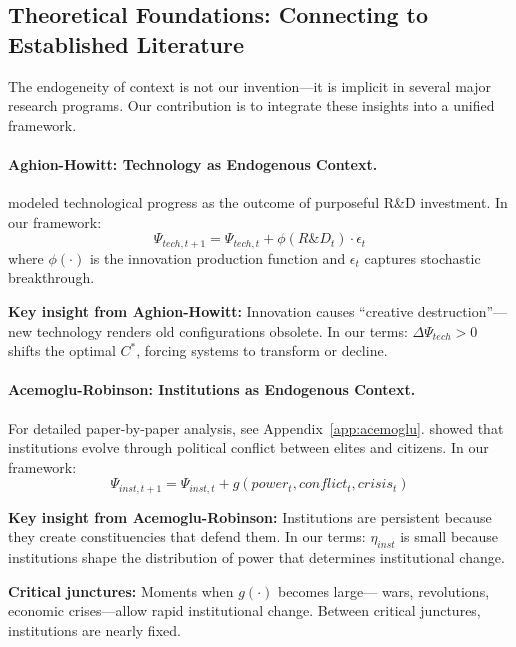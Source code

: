 \documentclass[12pt,a4paper]{article}
\begin{document}
\subsection{Theoretical Foundations: Connecting to Established Literature}

The endogeneity of context is not our invention---it is implicit in several major
research programs. Our contribution is to integrate these insights into a unified framework.

\paragraph{Aghion-Howitt: Technology as Endogenous Context.}
\citet{aghionhowitt} modeled technological progress as the outcome of
purposeful R\&D investment. In our framework:
\begin{equation}
  \Psi_{tech, t+1} = \Psi_{tech, t} + \phi(R\&D_t) \cdot \epsilon_t
\end{equation}
where $\phi(\cdot)$ is the innovation production function and $\epsilon_t$ captures
stochastic breakthrough.

\textbf{Key insight from Aghion-Howitt:} Innovation causes ``creative destruction''---
new technology renders old configurations obsolete.
In our terms: $\Delta \Psi_{tech} > 0$ shifts the optimal $C^*$,
forcing systems to transform or decline.

\paragraph{Acemoglu-Robinson: Institutions as Endogenous Context.}
For detailed paper-by-paper analysis, see Appendix~\ref{app:acemoglu}.
\citet{acemoglu} showed that institutions evolve through political conflict
between elites and citizens. In our framework:
\begin{equation}
  \Psi_{inst, t+1} = \Psi_{inst, t} + g(power_t, conflict_t, crisis_t)
\end{equation}

\textbf{Key insight from Acemoglu-Robinson:} Institutions are persistent because
they create constituencies that defend them.
In our terms: $\eta_{inst}$ is small because institutions shape the distribution
of power that determines institutional change.

\textbf{Critical junctures:} Moments when $g(\cdot)$ becomes large---
wars, revolutions, economic crises---allow rapid institutional change.
Between critical junctures, institutions are nearly fixed.
\end{document}
